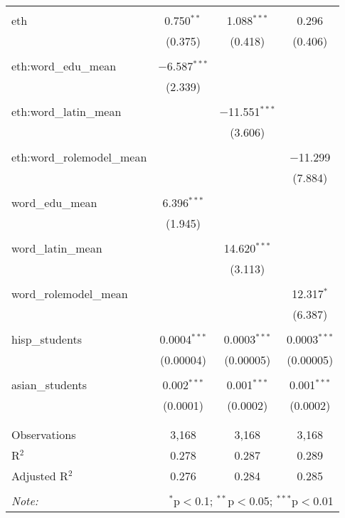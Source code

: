 \begin{table}[!htbp]
\begin{tabular}{@{\extracolsep{-2pt}}lccc}
  & & & \\ 
 eth & 0.750$^{**}$ & 1.088$^{***}$ & 0.296 \\ 
  & (0.375) & (0.418) & (0.406) \\ 
  & & & \\ 
 eth:word\_edu\_mean & $-$6.587$^{***}$ &  &  \\ 
  & (2.339) &  &  \\ 
  & & & \\ 
 eth:word\_latin\_mean &  & $-$11.551$^{***}$ &  \\ 
  &  & (3.606) &  \\ 
  & & & \\ 
 eth:word\_rolemodel\_mean &  &  & $-$11.299 \\ 
  &  &  & (7.884) \\ 
  & & & \\ 
 word\_edu\_mean & 6.396$^{***}$ &  &  \\ 
  & (1.945) &  &  \\ 
  & & & \\ 
 word\_latin\_mean &  & 14.620$^{***}$ &  \\ 
  &  & (3.113) &  \\ 
  & & & \\ 
 word\_rolemodel\_mean &  &  & 12.317$^{*}$ \\ 
  &  &  & (6.387) \\ 
  & & & \\ 
 hisp\_students & 0.0004$^{***}$ & 0.0003$^{***}$ & 0.0003$^{***}$ \\ 
  & (0.00004) & (0.00005) & (0.00005) \\ 
  & & & \\ 
 asian\_students & 0.002$^{***}$ & 0.001$^{***}$ & 0.001$^{***}$ \\ 
  & (0.0001) & (0.0002) & (0.0002) \\ 
  & & & \\ 
\hline \\[-1.8ex] 
Observations & 3,168 & 3,168 & 3,168 \\ 
R$^{2}$ & 0.278 & 0.287 & 0.289 \\ 
Adjusted R$^{2}$ & 0.276 & 0.284 & 0.285 \\ 
\hline 
\hline \\[-1.8ex] 
\textit{Note:}  & \multicolumn{3}{r}{$^{*}$p$<$0.1; $^{**}$p$<$0.05; $^{***}$p$<$0.01} \\ 
\end{tabular} 
\end{table} 
